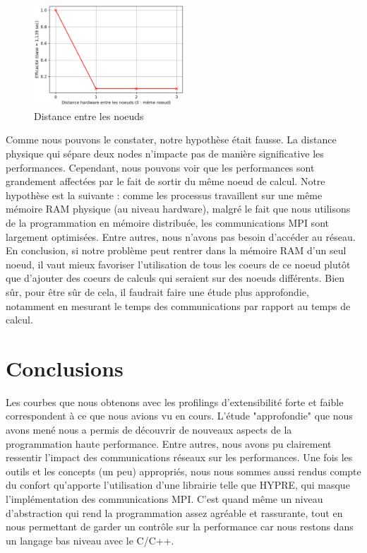 \documentclass[10pt,twocolumn,letterpaper]{article}
\begin{document}
\begin{figure}[H]
    \centering
    \caption{Distance entre les noeuds}
    \includegraphics[width=0.50\textwidth]{fig/dist_profiling.png}
  \end{figure}

Comme nous pouvons le constater, notre hypothèse était fausse. La distance
physique qui sépare deux nodes n'impacte pas de manière significative les
performances. Cependant, nous pouvons voir que les performances sont
grandement affectées par le fait de sortir du même noeud de calcul.
Notre hypothèse est la suivante : comme les processus travaillent sur une
même mémoire RAM physique (au niveau hardware), malgré le fait que nous
utilisons de la programmation en mémoire distribuée, les communications MPI
sont largement optimisées. Entre autres, nous n'avons pas besoin d'accéder
au réseau. En conclusion, si notre problème peut rentrer dans la mémoire RAM
d'un seul noeud, il vaut mieux favoriser l'utilisation de tous les coeurs de
ce noeud plutôt que d'ajouter des coeurs de calculs qui seraient sur des noeuds
différents. Bien sûr, pour être sûr de cela, il faudrait faire une étude plus
approfondie, notamment en mesurant le temps des communications par rapport au
temps de calcul.

\section*{Conclusions}

Les courbes que nous obtenons avec les profilings d'extensibilité forte et
faible correspondent à ce que nous avions vu en cours.
L'étude "approfondie"
que nous avons mené nous a permis de découvrir de nouveaux aspects de la
programmation haute performance. Entre autres, nous avons pu clairement
ressentir l'impact des communications réseaux sur les performances.
Une fois les outils et les concepts (un peu) appropriés, nous nous sommes aussi
rendus compte du confort qu'apporte l'utilisation
d'une librairie telle que HYPRE,
qui masque l'implémentation des communications MPI. C'est quand même un niveau
d'abstraction qui rend la programmation assez agréable et rassurante, tout en
nous permettant de garder un contrôle sur la performance
car nous restons dans un langage bas niveau avec le C/C++.
\end{document}
